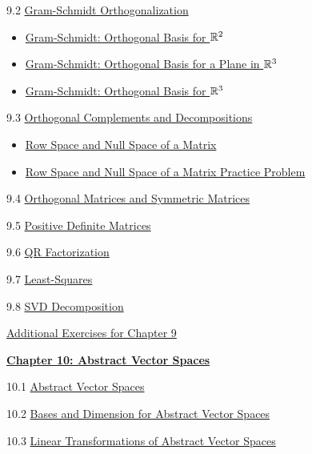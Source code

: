 \documentclass{ximera}
\begin{document}
9.2	\href{https://ximera.osu.edu/oerlinalg/LinearAlgebra/RTH-0015/main}{Gram-Schmidt Orthogonalization}
\begin{itemize}
    \item 
    \href{https://www.geogebra.org/m/xtqppyav}{Gram-Schmidt: Orthogonal Basis for $\mathbb{R}^2$}
    \item
    \href{https://www.geogebra.org/m/zghsfkym}{Gram-Schmidt: Orthogonal Basis for a Plane in $\mathbb{R}^3$}
    \item
    \href{https://www.geogebra.org/m/qjpvmsws}{Gram-Schmidt:  Orthogonal Basis for $\mathbb{R}^3$}
\end{itemize}
	
9.3	\href{https://ximera.osu.edu/oerlinalg/LinearAlgebra/RTH-0020/main}{Orthogonal Complements and Decompositions}
\begin{itemize}
    \item 
    \href{https://www.geogebra.org/m/f6eavqxs}{Row Space and Null Space of a Matrix}
    \item
    \href{https://www.geogebra.org/m/tyntjmdp}{Row Space and Null Space of a Matrix Practice Problem}
\end{itemize}
	
9.4	\href{https://ximera.osu.edu/oerlinalg/LinearAlgebra/RTH-0035/main}{Orthogonal Matrices and Symmetric Matrices}
	
9.5	\href{https://ximera.osu.edu/oerlinalg/LinearAlgebra/RTH-0045/main}{Positive Definite Matrices}
	
9.6	\href{https://ximera.osu.edu/oerlinalg/LinearAlgebra/RTH-0040/main}{QR Factorization}
	
9.7	\href{https://ximera.osu.edu/oerlinalg/LinearAlgebra/RTH-0030/main}{Least-Squares}
	
9.8	\href{https://ximera.osu.edu/oerlinalg/LinearAlgebra/RTH-0060/main}{SVD Decomposition}
	
\href{https://ximera.osu.edu/oerlinalg/LinearAlgebra/SUPX-0090/main}{Additional Exercises for Chapter 9}
	
\href{https://ximera.osu.edu/oerlinalg/LinearAlgebra/XLAChapter_vecSpaces/main}{\textbf{Chapter 10: Abstract Vector Spaces}}
	
10.1	\href{https://ximera.osu.edu/oerlinalg/LinearAlgebra/VSP-0050/main}{Abstract Vector Spaces}
	
10.2	\href{https://ximera.osu.edu/oerlinalg/LinearAlgebra/VSP-0060/main}{Bases and Dimension for Abstract Vector Spaces}
	
10.3	\href{https://ximera.osu.edu/oerlinalg/LinearAlgebra/LTR-0022/main}{Linear Transformations of Abstract Vector Spaces}
	
\end{document}
